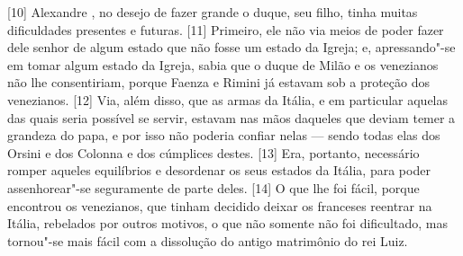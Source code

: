 {[}10{]} Alexandre , no desejo de fazer grande o duque, seu filho,
tinha muitas dificuldades presentes e futuras. {[}11{]} Primeiro, ele
não via meios de poder fazer dele senhor de algum estado que não fosse
um estado da Igreja; e, apressando"-se em tomar algum estado da Igreja,
sabia que o duque de Milão e os venezianos não lhe consentiriam,
porque Faenza e Rimini já estavam sob a proteção dos venezianos.
{[}12{]} Via, além disso, que as armas da Itália, e em particular
aquelas das quais seria possível se servir, estavam nas mãos daqueles
que deviam temer a grandeza do papa, e por isso não poderia confiar
nelas --- sendo todas elas dos Orsini e dos Colonna e dos cúmplices destes. {[}13{]} Era, portanto, necessário
romper aqueles equilíbrios e desordenar os seus estados da Itália, para
poder assenhorear"-se seguramente de parte deles. {[}14{]} O que lhe foi
fácil, porque encontrou os venezianos, que tinham decidido deixar os
franceses reentrar na Itália, rebelados por outros motivos, o que não somente não foi dificultado, mas tornou"-se mais
fácil com a dissolução do antigo matrimônio do rei Luiz.


